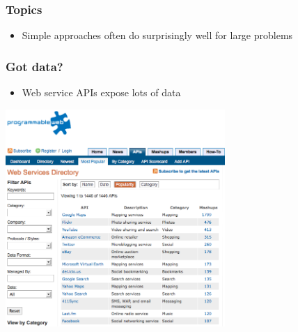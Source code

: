 \documentclass[xcolor=dvipsnames, 9pt]{beamer}
\begin{document}



\begin{frame}
  \frametitle{Topics}

  \begin{itemize}
    \item Simple approaches often do surprisingly well for large problems
  \end{itemize}

\end{frame}


\begin{frame}
  \frametitle{Got data?}

  \begin{itemize}
    \item Web service APIs expose lots of data
  \end{itemize}

    \begin{center}
      \includegraphics[width=0.625\textwidth]{programmableweb.png}
    \end{center}

\end{frame}
\end{document}
